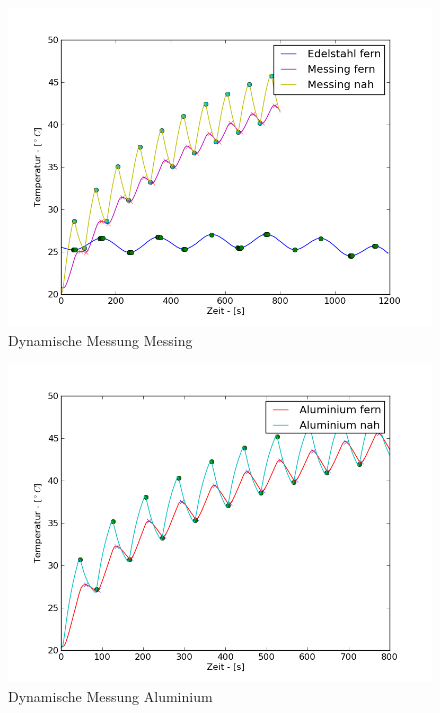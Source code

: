 \documentclass[11pt]{article}
\begin{document}
\begin{figure}[P]
\centering
\includegraphics[width=\textwidth]{Diagramme/dyn_messing.png}
\caption{Dynamische Messung Messing}
\label{dyn_messing}
\end{figure}
\begin{figure}[P]
\centering
\includegraphics[width=\textwidth]{Diagramme/dyn_alu.png}
\caption{Dynamische Messung Aluminium}
\label{dyn_alu}
\end{figure}
\end{document}
